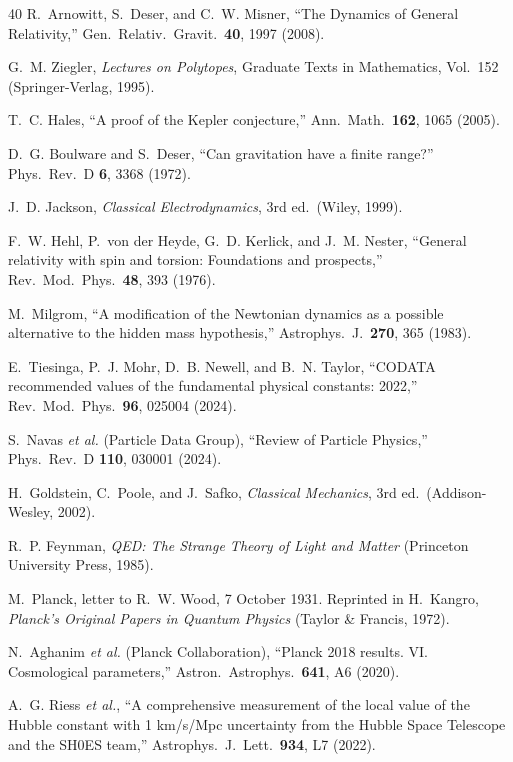 \documentclass[aps,prd,preprint,superscriptaddress,showpacs,preprintnumbers,amsmath,amssymb,nofootinbib]{revtex4-2}
\begin{document}
\begin{thebibliography}{40}
R.~Arnowitt, S.~Deser, and C.~W. Misner, ``The Dynamics of General Relativity,'' Gen.\ Relativ.\ Gravit.\ \textbf{40}, 1997 (2008).

G.~M. Ziegler, \emph{Lectures on Polytopes}, Graduate Texts in Mathematics, Vol.~152 (Springer-Verlag, 1995).

T.~C. Hales, ``A proof of the Kepler conjecture,'' Ann.\ Math.\ \textbf{162}, 1065 (2005).

D.~G. Boulware and S.~Deser, ``Can gravitation have a finite range?'' Phys.\ Rev.\ D \textbf{6}, 3368 (1972).

J.~D. Jackson, \emph{Classical Electrodynamics}, 3rd ed.\ (Wiley, 1999).

F.~W. Hehl, P.~von der Heyde, G.~D. Kerlick, and J.~M. Nester, ``General relativity with spin and torsion: Foundations and prospects,'' Rev.\ Mod.\ Phys.\ \textbf{48}, 393 (1976).

M.~Milgrom, ``A modification of the Newtonian dynamics as a possible alternative to the hidden mass hypothesis,'' Astrophys.\ J.\ \textbf{270}, 365 (1983).

E.~Tiesinga, P.~J. Mohr, D.~B. Newell, and B.~N. Taylor, ``CODATA recommended values of the fundamental physical constants: 2022,'' Rev.\ Mod.\ Phys.\ \textbf{96}, 025004 (2024).

S.~Navas \textit{et al.} (Particle Data Group), ``Review of Particle Physics,'' Phys.\ Rev.\ D \textbf{110}, 030001 (2024).

H.~Goldstein, C.~Poole, and J.~Safko, \emph{Classical Mechanics}, 3rd ed.\ (Addison-Wesley, 2002).

R.~P. Feynman, \emph{QED: The Strange Theory of Light and Matter} (Princeton University Press, 1985).

M.~Planck, letter to R.~W. Wood, 7 October 1931. Reprinted in H.~Kangro, \emph{Planck's Original Papers in Quantum Physics} (Taylor \& Francis, 1972).

N.~Aghanim \textit{et al.} (Planck Collaboration), ``Planck 2018 results. VI. Cosmological parameters,'' Astron.\ Astrophys.\ \textbf{641}, A6 (2020).

A.~G. Riess \textit{et al.}, ``A comprehensive measurement of the local value of the Hubble constant with 1 km/s/Mpc uncertainty from the Hubble Space Telescope and the SH0ES team,'' Astrophys.\ J.\ Lett.\ \textbf{934}, L7 (2022).


\end{thebibliography}
\end{document}
